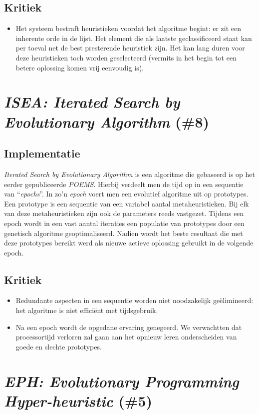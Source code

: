 \subsection{Kritiek}
\begin{itemize}
 \item Het systeem bestraft heuristieken voordat het algoritme begint: er zit een inherente orde in de lijst. Het element die als laatste geclassificeerd staat kan per toeval net de best presterende heuristiek zijn. Het kan lang duren voor deze heuristieken toch worden geselecteerd (vermits in het begin tot een betere oplossing komen vrij eenvoudig is).
\end{itemize}
\section{\emph{ISEA: Iterated Search by Evolutionary Algorithm} (\#8)}
\label{sss:isea}
\subsection{Implementatie}
\emph{Iterated Search by Evolutionary Algorithm}\cite{chesc-isea} is een algoritme die gebaseerd is op het eerder gepubliceerde \emph{POEMS}\cite{eurogp06:KubalikFaigl}. Hierbij verdeelt men de tijd op in een sequentie van ``\emph{epochs}''. In zo'n \emph{epoch} voert men een evolutief algoritme uit op prototypes. Een prototype is een sequentie van een variabel aantal metaheuristieken. Bij elk van deze metaheuristieken zijn ook de parameters reeds vastgezet. Tijdens een epoch wordt in een vast aantal iteraties een populatie van prototypes door een genetisch algoritme geoptimaliseerd. Nadien wordt het beste resultaat die met deze prototypes bereikt werd als nieuwe actieve oplossing gebruikt in de volgende epoch. 
\subsection{Kritiek}
\begin{itemize}
 \item Redundante aspecten in een sequentie worden niet noodzakelijk ge\"elimineerd: het algoritme is niet effici\"ent met tijdsgebruik.
 \item Na een epoch wordt de opgedane ervaring genegeerd. We verwachtten dat processortijd verloren zal gaan aan het opnieuw leren onderscheiden van goede en slechte prototypes.
\end{itemize}
\section{\emph{EPH: Evolutionary Programming Hyper-heuristic} (\#5)}
\label{sss:eph}

